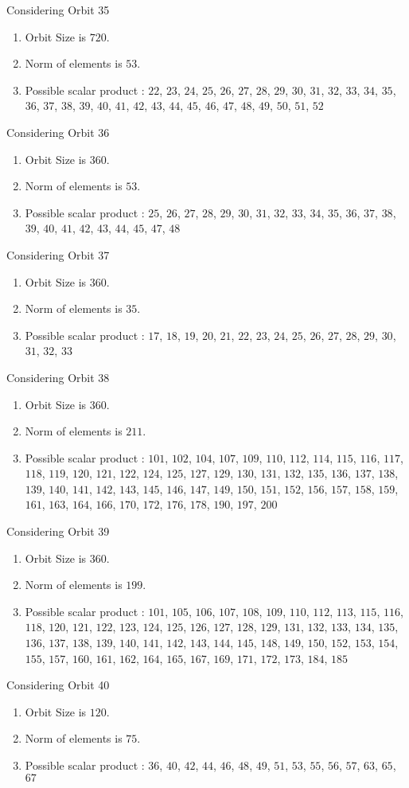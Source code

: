 \documentclass[12pt]{article}
\begin{document}
Considering Orbit 35
\begin{enumerate}
\item Orbit Size is $720$.
\item Norm of elements is $53$.
\item Possible scalar product : $22$, $23$, $24$, $25$, $26$, $27$, $28$, $29$, $30$, $31$, $32$, $33$, $34$, $35$, $36$, $37$, $38$, $39$, $40$, $41$, $42$, $43$, $44$, $45$, $46$, $47$, $48$, $49$, $50$, $51$, $52$
\end{enumerate}
Considering Orbit 36
\begin{enumerate}
\item Orbit Size is $360$.
\item Norm of elements is $53$.
\item Possible scalar product : $25$, $26$, $27$, $28$, $29$, $30$, $31$, $32$, $33$, $34$, $35$, $36$, $37$, $38$, $39$, $40$, $41$, $42$, $43$, $44$, $45$, $47$, $48$
\end{enumerate}
Considering Orbit 37
\begin{enumerate}
\item Orbit Size is $360$.
\item Norm of elements is $35$.
\item Possible scalar product : $17$, $18$, $19$, $20$, $21$, $22$, $23$, $24$, $25$, $26$, $27$, $28$, $29$, $30$, $31$, $32$, $33$
\end{enumerate}
Considering Orbit 38
\begin{enumerate}
\item Orbit Size is $360$.
\item Norm of elements is $211$.
\item Possible scalar product : $101$, $102$, $104$, $107$, $109$, $110$, $112$, $114$, $115$, $116$, $117$, $118$, $119$, $120$, $121$, $122$, $124$, $125$, $127$, $129$, $130$, $131$, $132$, $135$, $136$, $137$, $138$, $139$, $140$, $141$, $142$, $143$, $145$, $146$, $147$, $149$, $150$, $151$, $152$, $156$, $157$, $158$, $159$, $161$, $163$, $164$, $166$, $170$, $172$, $176$, $178$, $190$, $197$, $200$
\end{enumerate}
Considering Orbit 39
\begin{enumerate}
\item Orbit Size is $360$.
\item Norm of elements is $199$.
\item Possible scalar product : $101$, $105$, $106$, $107$, $108$, $109$, $110$, $112$, $113$, $115$, $116$, $118$, $120$, $121$, $122$, $123$, $124$, $125$, $126$, $127$, $128$, $129$, $131$, $132$, $133$, $134$, $135$, $136$, $137$, $138$, $139$, $140$, $141$, $142$, $143$, $144$, $145$, $148$, $149$, $150$, $152$, $153$, $154$, $155$, $157$, $160$, $161$, $162$, $164$, $165$, $167$, $169$, $171$, $172$, $173$, $184$, $185$
\end{enumerate}
Considering Orbit 40
\begin{enumerate}
\item Orbit Size is $120$.
\item Norm of elements is $75$.
\item Possible scalar product : $36$, $40$, $42$, $44$, $46$, $48$, $49$, $51$, $53$, $55$, $56$, $57$, $63$, $65$, $67$
\end{enumerate}
\end{document}
